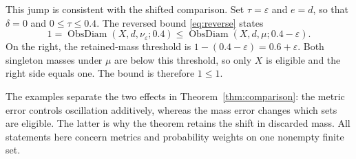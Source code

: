 \documentclass[a4paper,11pt]{article}
\DeclareMathOperator{\ObsDiam}{ObsDiam}
\begin{document}
This jump is consistent with the shifted comparison. Set
$\tau=\varepsilon$ and $e=d$, so that $\delta=0$ and
$0\le\tau\le0.4$. The reversed bound \eqref{eq:reverse} states
\[
 1=\ObsDiam(X,d,\nu_\varepsilon;0.4)
 \le\ObsDiam(X,d,\mu;0.4-\varepsilon).
\]
On the right, the retained-mass threshold is
$1-(0.4-\varepsilon)=0.6+\varepsilon$. Both singleton masses under
$\mu$ are below this threshold, so only $X$ is eligible and the
right side equals one. The bound is therefore $1\le1$.

The examples separate the two effects in Theorem~\ref{thm:comparison}:
the metric error controls oscillation additively, whereas the mass error
changes which sets are eligible. The latter is why the theorem retains
the shift in discarded mass. All statements here concern metrics and
probability weights on one nonempty finite set.
\end{document}
